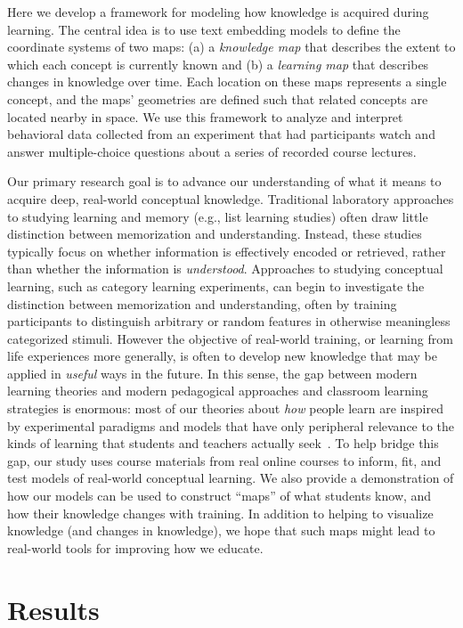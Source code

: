 \documentclass[10pt]{article}
\begin{document}
Here we develop a framework for modeling how knowledge is acquired during
learning. The central idea is to use text embedding models to define the
coordinate systems of two maps: (a) a \textit{knowledge map} that describes the
extent to which each concept is currently known and (b) a \textit{learning map}
that describes changes in knowledge over time. Each location on these maps
represents a single concept, and the maps' geometries are defined such that
related concepts are located nearby in space. We use this framework to analyze
and interpret behavioral data collected from an experiment that had
participants watch and answer multiple-choice questions about a series of
recorded course lectures.

Our primary research goal is to advance our understanding of what it means to
acquire deep, real-world conceptual knowledge. Traditional laboratory
approaches to studying learning and memory (e.g., list learning studies) often
draw little distinction between memorization and understanding. Instead, these
studies typically focus on whether information is effectively encoded or
retrieved, rather than whether the information is \textit{understood}.
Approaches to studying conceptual learning, such as category learning
experiments, can begin to investigate the distinction between memorization and
understanding, often by training participants to distinguish arbitrary or
random features in otherwise meaningless categorized stimuli. However the
objective of real-world training, or learning from life experiences more
generally, is often to develop new knowledge that may be applied in
\textit{useful} ways in the future. In this sense, the gap between modern
learning theories and modern pedagogical approaches and classroom learning
strategies is enormous: most of our theories about \textit{how} people learn
are inspired by experimental paradigms and models that have only peripheral
relevance to the kinds of learning that students and teachers actually
seek~\citep{Macl05, HallGree08}. To help bridge this gap, our study uses course
materials from real online courses to inform, fit, and test models of
real-world conceptual learning. We also provide a demonstration of how our
models can be used to construct ``maps'' of what students know, and how their
knowledge changes with training. In addition to helping to visualize knowledge
(and changes in knowledge), we hope that such maps might lead to real-world
tools for improving how we educate.

\section*{Results}
\end{document}
